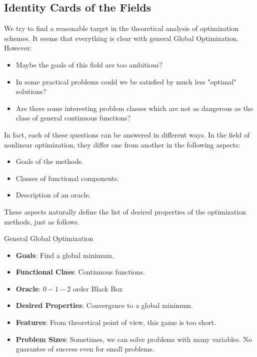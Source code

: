 \subsection{Identity Cards of the Fields}\label{subsec:Identity_Cards_of_the_Fields}

We try to find a reasonable target in the theoretical analysis of optimization schemes. It seems that everything is clear with general Global Optimization. However:
\begin{itemize}
    \item Maybe the goals of this field are too ambitious?
    \item In some practical problems could we be satisfied by much less "optimal" solutions?
    \item Are there some interesting problem classes which are not as dangerous as the class of general continuous functions?
\end{itemize}

In fact, each of these questions can be answered in different ways. In the field of nonlinear optimization, they differ one from another in the following aspects:
\begin{itemize}
    \item Goals of the methods.
    \item Classes of functional components.
    \item Description of an oracle.
\end{itemize}

These aspects naturally define the list of desired properties of the optimization methods, just as follows.

\begin{boxnote}{General Global Optimization}
    \begin{itemize}
        \item \textbf{Goals}: Find a global minimum.
        \item \textbf{Functional Class}: Continuous functions.
        \item \textbf{Oracle}: \(0-1-2\) order Black Box
        \item \textbf{Desired Properties}: Convergence to a global minimum.
        \item \textbf{Features}: From theoretical point of view, this game is too short.
        \item \textbf{Problem Sizes}: Sometimes, we can solve problems with many variables. No guarantee of success even for small problems.
    \end{itemize}
\end{boxnote}

